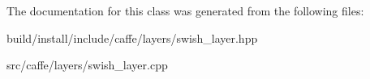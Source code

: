 The documentation for this class was generated from the following files\+:\begin{DoxyCompactItemize}
\item 
build/install/include/caffe/layers/swish\+\_\+layer.\+hpp\item 
src/caffe/layers/swish\+\_\+layer.\+cpp\end{DoxyCompactItemize}
